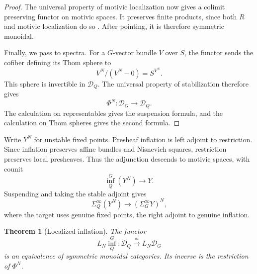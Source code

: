 \documentclass[11pt,reqno]{amsart}
\newtheorem{theorem}{Theorem}[section]
\theoremstyle{definition}
\theoremstyle{remark}
\theoremstyle{plain}
\numberwithin{equation}{section}
\newcommand{\D}{\mathcal D}
\begin{document}
\begin{proof}
The universal property of motivic localization now gives a
colimit preserving functor on motivic spaces.
It preserves finite products, since both \(R\) and motivic
localization do so
\cite[Proposition~3.15]{Hoyois}.
After pointing, it is therefore symmetric monoidal.

Finally, we pass to spectra.
For a \(G\)-vector bundle \(V\) over \(S\), the functor sends
the cofiber defining its Thom sphere to
\[
 V^N/(V^N-0)=S^{V^N}.
\]
This sphere is invertible in \(\D_Q\).
The universal property of stabilization therefore gives
\[
 \Phi^N:\D_G\longrightarrow\D_Q.
\]
The calculation on representables gives the suspension formula,
and the calculation on Thom spheres gives the second formula.
\end{proof}

Write \(Y^N\) for unstable fixed points.
Presheaf inflation is left adjoint to restriction.
Since inflation preserves affine bundles and Nisnevich squares,
restriction preserves local presheaves.
Thus the adjunction descends to motivic spaces, with counit
\[
 \operatorname{inf}_Q^G(Y^N)\longrightarrow Y.
\]
Suspending and taking the stable adjoint gives
\[
 \Sigma_Q^\infty(Y^N)
 \longrightarrow (\Sigma_G^\infty Y)^N,
\]
where the target uses genuine fixed points, the right adjoint
to genuine inflation.


\begin{theorem}[Localized inflation]\label{thm:normal-inflation}
The functor
\[
 L_N\operatorname{inf}_Q^G:
 \D_Q\xrightarrow{\ \simeq\ }L_N\D_G
\]
is an equivalence of symmetric monoidal categories.
Its inverse is the restriction of \(\Phi^N\).
\end{theorem}
\end{document}
